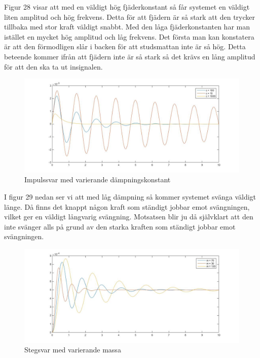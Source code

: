 \documentclass[10pt,a4paper]{article}
\begin{document}
Figur 28 visar att med en väldigt hög fjäderkonstant så får systemet en väldigt liten amplitud och hög frekvens. Detta för att fjädern är så stark att den trycker tillbaka med stor kraft väldigt snabbt. Med den låga fjäderkonstanten har man istället en mycket hög amplitud och låg frekvens. Det första man kan konstatera är att den förmodligen slår i backen för att studsmattan inte är så hög. Detta beteende kommer ifrån att fjädern inte är så stark så det krävs en lång amplitud för att den ska ta ut insignalen. 

\begin{figure}[h]
\begin{center}
\includegraphics[scale=0.4]{impulssvar(dampning)}
\caption{Impulssvar med varierande dämpningskonstant}
\end{center}
\end{figure}

I figur 29 nedan ser vi att med låg dämpning så kommer systemet svänga väldigt länge. Då finns det knappt någon kraft som ständigt jobbar emot svängningen, vilket ger en väldigt långvarig svängning. Motsatsen blir ju då självklart att den inte svänger alls på grund av den starka kraften som ständigt jobbar emot svängningen.
\newpage

\begin{figure}[h]
\begin{center}
\includegraphics[scale=0.4]{stegsvar(massa)}
\caption{Stegsvar med varierande massa}
\end{center}
\end{figure}
\end{document}
